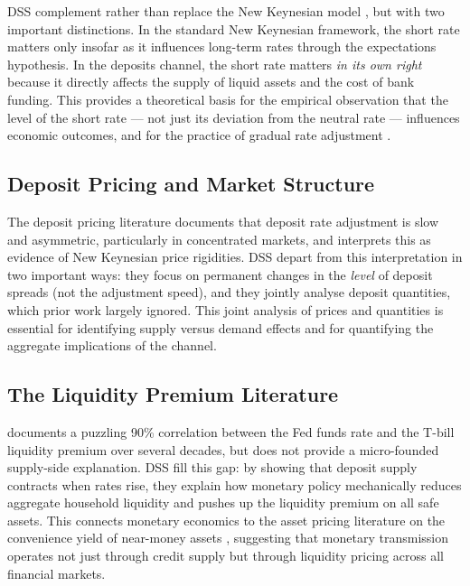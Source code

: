 \documentclass[12pt,a4paper]{article}
\begin{document}
DSS complement rather than replace the New Keynesian model \citep{woodford_2003},
but with two important distinctions. In the standard New Keynesian framework,
the short rate matters only insofar as it influences long-term rates through
the expectations hypothesis. In the deposits channel, the short rate matters
\emph{in its own right} because it directly affects the supply of liquid assets
and the cost of bank funding. This provides a theoretical basis for the
empirical observation that the level of the short rate --- not just its
deviation from the neutral rate --- influences economic outcomes, and for the
practice of gradual rate adjustment \citep{bernanke_2004, stein_sunderam_2015}.

\subsection{Deposit Pricing and Market Structure}

The deposit pricing literature \citep{hannan_berger_1989, hannan_berger_1991,
neumark_sharpe_1992, driscoll_judson_2013} documents that deposit rate
adjustment is slow and asymmetric, particularly in concentrated markets, and
interprets this as evidence of New Keynesian price rigidities. DSS depart from
this interpretation in two important ways: they focus on permanent changes in
the \emph{level} of deposit spreads (not the adjustment speed), and they
jointly analyse deposit quantities, which prior work largely ignored. This
joint analysis of prices and quantities is essential for identifying supply
versus demand effects and for quantifying the aggregate implications of the
channel.

\subsection{The Liquidity Premium Literature}

\citet{nagel_2016} documents a puzzling 90\% correlation between the Fed funds
rate and the T-bill liquidity premium over several decades, but does not
provide a micro-founded supply-side explanation. DSS fill this gap: by showing
that deposit supply contracts when rates rise, they explain how monetary policy
mechanically reduces aggregate household liquidity and pushes up the liquidity
premium on all safe assets. This connects monetary economics to the asset
pricing literature on the convenience yield of near-money assets
\citep{krishnamurthy_vissing_2012}, suggesting that monetary transmission
operates not just through credit supply but through liquidity pricing across
all financial markets.
\end{document}
